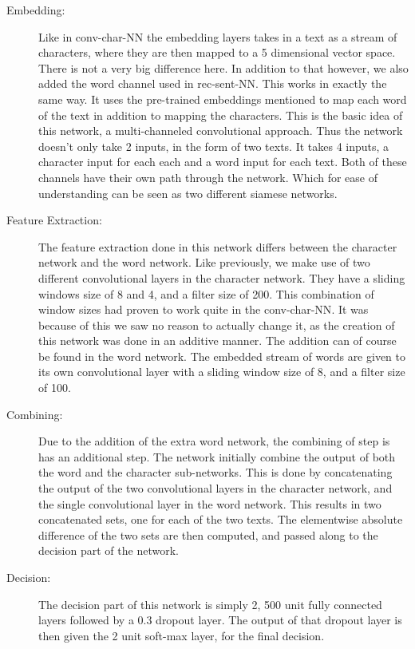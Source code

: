\begin{description}

    \item[Embedding:]

    Like in \gls{conv-char-NN} the embedding layers takes in a text as a
    stream of characters, where they are then mapped to a 5 dimensional vector
    space. There is not a very big difference here. In addition to that however,
    we also added the word channel used in \gls{rec-sent-NN}. This works in
    exactly the same way. It uses the pre-trained embeddings mentioned to map
    each word of the text in addition to mapping the characters. This is the
    basic idea of this network, a multi-channeled convolutional approach. Thus
    the network doesn't only take 2 inputs, in the form of two texts. It takes 4
    inputs, a character input for each each and a word input for each text. Both
    of these channels have their own path through the network. Which for ease of
    understanding can be seen as two different siamese networks.

    \item[Feature Extraction:]

    The feature extraction done in this network differs between the character
    network and the word network. Like previously, we make use of two different
    convolutional layers in the character network. They have a sliding windows
    size of 8 and 4, and a filter size of 200. This combination of window sizes
    had proven to work quite in the \gls{conv-char-NN}. It was because of this
    we saw no reason to actually change it, as the creation of this network was
    done in an additive manner. The addition can of course be found in the word
    network. The embedded stream of words are given to its own convolutional
    layer with a sliding window size of 8, and a filter size of 100.

    \item[Combining:]

    Due to the addition of the extra word network, the combining of step is
    has an additional step. The network initially combine the output of both
    the word and the character sub-networks. This is done by concatenating
    the output of the two convolutional layers in the character network, and
    the single convolutional layer in the word network. This results in two
    concatenated sets, one for each of the two texts. The elementwise absolute
    difference of the two sets are then computed, and passed along to the
    decision part of the network.

    \item[Decision:]

    The decision part of this network is simply 2, 500 unit fully connected
    layers followed by a 0.3 dropout layer. The output of that dropout layer
    is then given the 2 unit soft-max layer, for the final decision.

\end{description}

